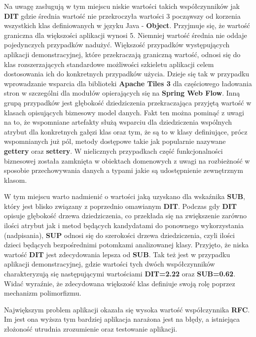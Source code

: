 	Na uwagę zasługują w tym miejscu niskie wartości takich współczynników 
	jak \textbf{DIT} gdzie średnia wartość nie przekroczyła wartości 3 począwszy
	od korzenia wszystkich klas definiowanych w języku Java - \textbf{Object}. 
	Przyjmuje się, że wartość graniczna dla większości aplikacji wynosi 5.
	Niemniej wartość średnia nie oddaje pojedynczych przypadków nadużyć. 
	Większość przypadków występujących  aplikacji demonstracyjnej, które
	przekraczają graniczną wartość, odnosi się do klas rozszerzających 
	standardowe możliwości szkieletu aplikacji celem dostosowania ich do konkretnych przypadków użycia.
	Dzieje się tak w przypadku wprowadzanie wsparcia dla biblioteki \textbf{Apache Tiles 3} 
	dla częściowego ładowania stron w szczególni dla modułów opierających się na
	\textbf{Spring Web Flow}. Inną grupą przypadków jest głębokość dziedziczenia 
	przekraczająca przyjętą wartość w klasach opisujących biznesowy model danych. Fakt ten można
	pominąć z uwagi na to, że wspomniane artefakty służą wsparciu dla dziedziczenia 
	wspólnych atrybut dla konkretnych gałęzi klas oraz tym, że są to w klasy definiujące, prócz 
	wspomnianych już pól, metody dostępowe takie jak popularnie nazywane \textbf{gettery} 
	oraz \textbf{settery}. W nielicznych przypadkach część funkcjonalności biznesowej została
	zamknięta w obiektach domenowych z uwagi na rozbieżność w sposobie przechowywania 
	danych a typami jakie są udostępnienie zewnętrznym klasom. 
	
	W tym miejscu warto nadmienić o wartości jaką uzyskano dla wskaźnika \textbf{SUB}, 
	który jest blisko związany z poprzednio omawianym \textbf{DIT}. 
	Podczas gdy \textbf{DIT} opisuje głębokość drzewa dziedziczenia, 
	co przekłada się na zwiększenie zarówno ilości atrybut jak i metod będących
	kandydatami do ponownego wykorzystania (nadpisania), \textbf{SUP} 
	odnosi się do szerokości drzewa dziedziczenia, czyli ilości dzieci będących 
	bezpośrednimi potomkami analizowanej klasy. Przyjęto, że niska wartość 
	\textbf{DIT} jest zdecydowania lepsza od \textbf{SUB}. Tak też jest w przypadku aplikacji
	demonstracyjnej, gdzie wartości tych dwóch współczynników 
	charakteryzują się następującymi wartościami \textbf{DIT=2.22} oraz \textbf{SUB=0.62}. Widać wyraźnie, że
	zdecydowana większość klas definiuje swoją rolę poprzez mechanizm polimorfizmu.
	
	Największym problem aplikacji okazała się wysoka wartość 
	współczynnika \textbf{RFC}. Im jest ona wyższa tym bardziej aplikacja narażona jest na błędy, a
	istniejąca złożoność utrudnia zrozumienie oraz testowanie aplikacji. 
	

